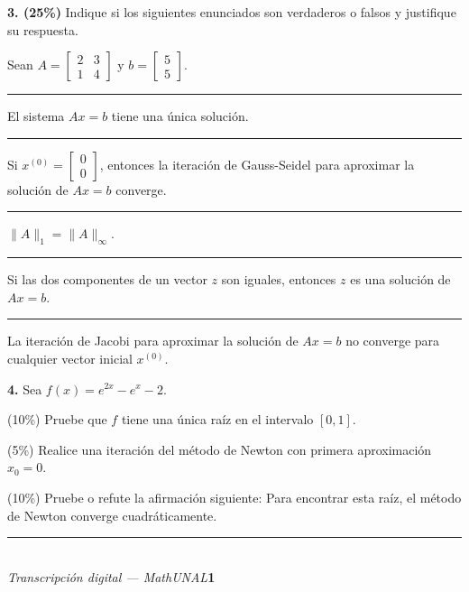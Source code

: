 \documentclass[11pt]{article}
\begin{document}
\vspace{5mm}
\noindent\textbf{3. (25\%)} Indique si los siguientes enunciados son verdaderos o falsos y justifique su respuesta.

\noindent Sean $A=\begin{bmatrix}2&3\\1&4\end{bmatrix}$ y $b=\begin{bmatrix}5\\5\end{bmatrix}$.
\begin{opciones}
\item \rule{2cm}{0.4pt} El sistema $Ax=b$ tiene una única solución.
\item \rule{2cm}{0.4pt} Si $x^{(0)}=\begin{bmatrix}0\\0\end{bmatrix}$, entonces la iteración de Gauss-Seidel para aproximar la solución de $Ax=b$ converge.
\item \rule{2cm}{0.4pt} $\|A\|_1=\|A\|_\infty$.
\item \rule{2cm}{0.4pt} Si las dos componentes de un vector $z$ son iguales, entonces $z$ es una solución de $Ax=b$.
\item \rule{2cm}{0.4pt} La iteración de Jacobi para aproximar la solución de $Ax=b$ no converge para cualquier vector inicial $x^{(0)}$.
\end{opciones}

\vspace{5mm}
\noindent\textbf{4.} Sea $f(x)=e^{2x}-e^x-2$.
\begin{opciones}
\item (10\%) Pruebe que $f$ tiene una única raíz en el intervalo $[0,1]$.
\item (5\%) Realice una iteración del método de Newton con primera aproximación $x_0=0$.
\item (10\%) Pruebe o refute la afirmación siguiente: Para encontrar esta raíz, el método de Newton converge cuadráticamente.
\end{opciones}

\vfill
\rule{\linewidth}{0.4pt}\\[1pt]
{\scriptsize\textit{Transcripción digital --- MathUNAL}\hfill\textcolor{unalblue}{\textbf{1}}}
\end{document}
